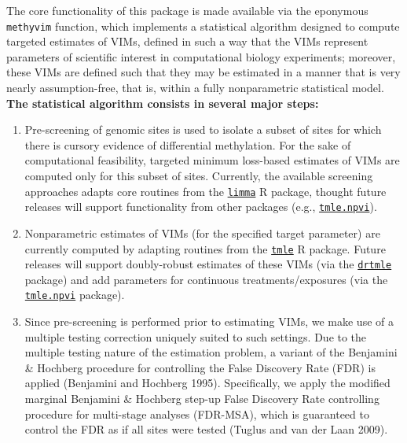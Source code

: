 \documentclass[9pt,a4paper,]{extarticle}
\theoremstyle{definition}
\theoremstyle{definition}
\theoremstyle{definition}
\theoremstyle{remark}
\begin{document}
The core functionality of this package is made available via the
eponymous \texttt{methyvim} function, which implements a statistical
algorithm designed to compute targeted estimates of VIMs, defined in
such a way that the VIMs represent parameters of scientific interest in
computational biology experiments; moreover, these VIMs are defined such
that they may be estimated in a manner that is very nearly
assumption-free, that is, within a fully nonparametric statistical
model. \textbf{The statistical algorithm consists in several major
steps:}

\begin{enumerate}
\def\labelenumi{\arabic{enumi}.}
\item
  Pre-screening of genomic sites is used to isolate a subset of sites
  for which there is cursory evidence of differential methylation. For
  the sake of computational feasibility, targeted minimum loss-based
  estimates of VIMs are computed only for this subset of sites.
  Currently, the available screening approaches adapts core routines
  from the
  \href{http://bioconductor.org/packages/release/bioc/html/limma.html}{\texttt{limma}}
  R package, thought future releases will support functionality from
  other packages (e.g.,
  \href{https://CRAN.R-project.org/package=tmle.npvi}{\texttt{tmle.npvi}}).
\item
  Nonparametric estimates of VIMs (for the specified target parameter)
  are currently computed by adapting routines from the
  \href{https://CRAN.R-project.org/package=tmle}{\texttt{tmle}} R
  package. Future releases will support doubly-robust estimates of these
  VIMs (via the
  \href{https://cran.r-project.org/web/packages/drtmle/index.html}{\texttt{drtmle}}
  package) and add parameters for continuous treatments/exposures (via
  the
  \href{https://CRAN.R-project.org/package=tmle.npvi}{\texttt{tmle.npvi}}
  package).
\item
  Since pre-screening is performed prior to estimating VIMs, we make use
  of a multiple testing correction uniquely suited to such settings. Due
  to the multiple testing nature of the estimation problem, a variant of
  the Benjamini \& Hochberg procedure for controlling the False
  Discovery Rate (FDR) is applied (Benjamini and Hochberg 1995).
  Specifically, we apply the modified marginal Benjamini \& Hochberg
  step-up False Discovery Rate controlling procedure for multi-stage
  analyses (FDR-MSA), which is guaranteed to control the FDR as if all
  sites were tested (Tuglus and van der Laan 2009).
\end{enumerate}
\end{document}
